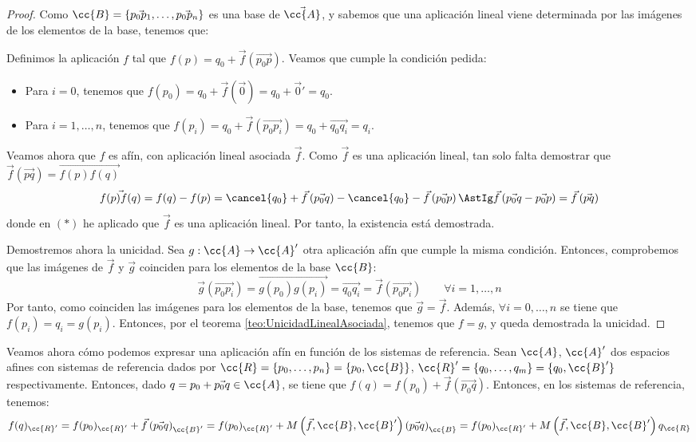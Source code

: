 \begin{proof}
    Como $\cc{B}=\{\vec{p_0p_1},\dots,\vec{p_0p_n}\}$ es una base de $\vec{\cc{A}}$, y sabemos que una aplicación lineal viene determinada por las imágenes de los elementos de la base, tenemos que:

    Definimos la aplicación $f$ tal que $f(p)=q_0+\vec{f}\left(\vec{p_0p}\right)$. Veamos que cumple la condición pedida:
    \begin{itemize}
        \item Para $i=0$, tenemos que $f(p_0)=q_0+\vec{f}(\vec{0}) = q_0+\vec{0}'=q_0$.
        \item Para $i=1,\dots,n$, tenemos que $f(p_i)=q_0+\vec{f}(\vec{p_0p_i}) = q_0+\vec{q_0q_i} = q_i$.
    \end{itemize}

    Veamos ahora que $f$ es afín, con aplicación lineal asociada $\vec{f}$. Como $\vec{f}$ es una aplicación lineal, tan solo falta demostrar que $\vec{f}(\vec{pq}) = \vec{f(p)f(q)}$
    \begin{equation*}
        \vec{f(p)f(q)} = f(q)-f(p) = \cancel{q_0}+\vec{f}\left(\vec{p_0q}\right)-\cancel{q_0}-\vec{f}\left(\vec{p_0p}\right) \AstIg \vec{f}\left(\vec{p_0q} -\vec{p_0p}\right) =\vec{f}\left(\vec{pq}\right)
    \end{equation*}
    donde en $(\ast)$ he aplicado que $\vec{f}$ es una aplicación lineal. Por tanto, la existencia está demostrada.

    Demostremos ahora la unicidad. Sea $g:\cc{A}\to \cc{A}'$ otra aplicación afín que cumple la misma condición. Entonces, comprobemos que las imágenes de $\vec{f}$ y $\vec{g}$ coinciden para los elementos de la base $\cc{B}$:
    \begin{equation*}
        \vec{g}\left(\vec{p_0p_i}\right) = \vec{g(p_0)g(p_i)} = \vec{q_0q_i} = \vec{f}\left(\vec{p_0p_i}\right) \qquad \forall i=1,\dots,n
    \end{equation*}
    Por tanto, como coinciden las imágenes para los elementos de la base, tenemos que $\vec{g}=\vec{f}$. Además, $\forall i=0,\dots,n$ se tiene que $f(p_i)=q_i=g(p_i)$. Entonces, por el teorema \ref{teo:UnicidadLinealAsociada}, tenemos que $f=g$, y queda demostrada la unicidad.
\end{proof}\vspace{1cm}

Veamos ahora cómo podemos expresar una aplicación afín en función de los sistemas de referencia. Sean $\cc{A}$, $\cc{A}'$ dos espacios afines con sistemas de referencia dados por $\cc{R}=\{p_0,\dots,p_n\}=\{p_0,\cc{B}\}$, $\cc{R}'=\{q_0,\dots,q_m\}=\{q_0,\cc{B}'\}$ respectivamente. Entonces, dado $q=p_0+\vec{p_0q}\in \cc{A}$, se tiene que $f(q)=f(p_0)+\vec{f}(\vec{p_0q})$. Entonces, en los sistemas de referencia, tenemos:
\begin{equation*}
    f(q)_{\cc{R}'} = f(p_0)_{\cc{R}'} + \vec{f}\left(\vec{p_0q}\right)_{\cc{B}'}
    = f(p_0)_{\cc{R}'} + M\left(\vec{f},\cc{B},\cc{B}'\right)\left(\vec{p_0q}\right)_{\cc{B}}
    = f(p_0)_{\cc{R}'} + M\left(\vec{f},\cc{B},\cc{B}'\right)q_{\cc{R}}
\end{equation*}

